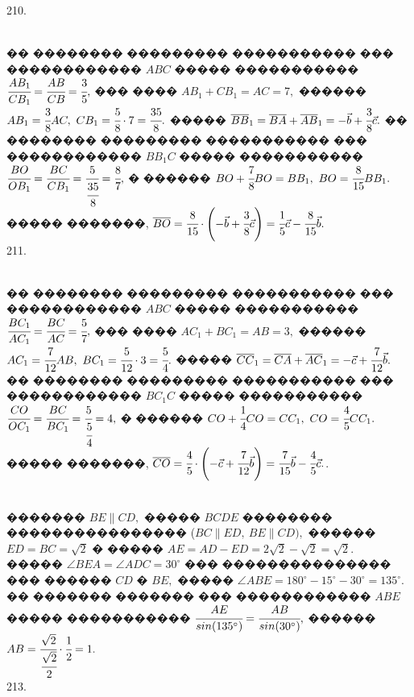\documentclass[12pt]{article}
\begin{document}
210. \begin{figure}[ht!]
\end{figure}\\
�� �������� ��������� ����������� ��� ������������ $ABC$ ����� �����������
$\cfrac{AB_1}{CB_1}=\cfrac{AB}{CB}=\cfrac{3}{5},$ ��� ���� $AB_1+CB_1=AC=7,$ ������ $AB_1=\cfrac{3}{8}AC,\ CB_1=\cfrac{5}{8}\cdot7=\cfrac{35}{8}.$ ����� $\overline{BB}_1=\overline{BA}+\overline{AB}_1=-\vec{b}+\cfrac{3}{8}\vec{c}.$
�� �������� ��������� ����������� ��� ������������ $BB_1C$ ����� �����������
$\cfrac{BO}{OB_1}=\cfrac{BC}{CB_1}=\cfrac{5}{\cfrac{35}{8}}=\cfrac{8}{7},$ � ������ $BO+\cfrac{7}{8}BO=BB_1,\ BO=\cfrac{8}{15}BB_1.$ ����� �������, $\overline{BO}=\cfrac{8}{15}\cdot\left(-\vec{b}+\cfrac{3}{8}\vec{c}\right)=
\cfrac{1}{5}\vec{c}-\cfrac{8}{15}\vec{b}.$\\
211. \begin{figure}[ht!]
\end{figure}\\
�� �������� ��������� ����������� ��� ������������ $ABC$ ����� �����������
$\cfrac{BC_1}{AC_1}=\cfrac{BC}{AC}=\cfrac{5}{7},$ ��� ���� $AC_1+BC_1=AB=3,$ ������ $AC_1=\cfrac{7}{12}AB,\ BC_1=\cfrac{5}{12}\cdot3=\cfrac{5}{4}.$ ����� $\overline{CC}_1=\overline{CA}+\overline{AC}_1=-\vec{c}+\cfrac{7}{12}\vec{b}.$
�� �������� ��������� ����������� ��� ������������ $BC_1C$ ����� �����������
$\cfrac{CO}{OC_1}=\cfrac{BC}{BC_1}=\cfrac{5}{\cfrac{5}{4}}=4,$ � ������ $CO+\cfrac{1}{4}CO=CC_1,\ CO=\cfrac{4}{5}CC_1.$ ����� �������, $\overline{CO}=\cfrac{4}{5}\cdot\left(-\vec{c}+\cfrac{7}{12}\vec{b}\right)=
\cfrac{7}{15}\vec{b}-\cfrac{4}{5}\vec{c}.$\newpage{}. \begin{figure}[ht!]
\end{figure}\\
������� $BE\parallel CD,$ ����� $BCDE$ �������� ���������������� ($BC\parallel ED,\ BE\parallel CD),$ ������ $ED=BC=\sqrt{2}$ � ����� $AE=AD-ED=2\sqrt{2}-\sqrt{2}=\sqrt{2}.$ ����� $\angle BEA=\angle ADC=30^\circ$ ��� ��������������� ��� ������ $CD$ � $BE,$ ����� $\angle ABE=180^\circ-15^\circ-30^\circ=135^\circ.$ �� ������� ������� ��� ������������ $ABE$ ����� ����������� $\cfrac{AE}{sin(135^\circ)}=\cfrac{AB}{sin(30^\circ)},$ ������ $AB=\cfrac{\sqrt{2}}{\cfrac{\sqrt{2}}{2}}\cdot\cfrac{1}{2}=1.$\\
213. \begin{figure}[ht!]
\end{figure}\\
\end{document}
